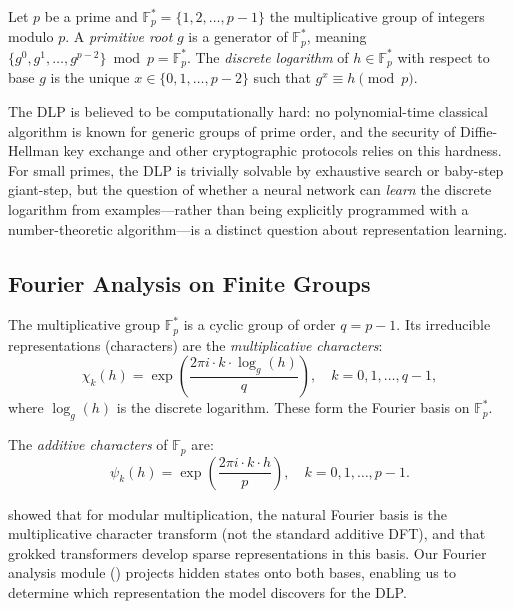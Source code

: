 \documentclass[11pt]{article}
\newcommand{\Fp}{\mathbb{F}_p}
\newcommand{\Fps}{\mathbb{F}_p^*}
\begin{document}
Let $p$ be a prime and $\Fps = \{1, 2, \ldots, p-1\}$ the multiplicative group of integers modulo $p$. A \emph{primitive root} $g$ is a generator of $\Fps$, meaning $\{g^0, g^1, \ldots, g^{p-2}\} \bmod p = \Fps$. The \emph{discrete logarithm} of $h \in \Fps$ with respect to base $g$ is the unique $x \in \{0, 1, \ldots, p-2\}$ such that $g^x \equiv h \pmod{p}$.

The DLP is believed to be computationally hard: no polynomial-time classical algorithm is known for generic groups of prime order, and the security of Diffie-Hellman key exchange \citep{diffie1976new} and other cryptographic protocols relies on this hardness. For small primes, the DLP is trivially solvable by exhaustive search or baby-step giant-step, but the question of whether a neural network can \emph{learn} the discrete logarithm from examples---rather than being explicitly programmed with a number-theoretic algorithm---is a distinct question about representation learning.

\subsection{Fourier Analysis on Finite Groups}

The multiplicative group $\Fps$ is a cyclic group of order $q = p - 1$. Its irreducible representations (characters) are the \emph{multiplicative characters}:
\begin{equation}
    \chi_k(h) = \exp\!\left(\frac{2\pi i \cdot k \cdot \log_g(h)}{q}\right), \quad k = 0, 1, \ldots, q-1,
\end{equation}
where $\log_g(h)$ is the discrete logarithm. These form the Fourier basis on $\Fps$.

The \emph{additive characters} of $\Fp$ are:
\begin{equation}
    \psi_k(h) = \exp\!\left(\frac{2\pi i \cdot k \cdot h}{p}\right), \quad k = 0, 1, \ldots, p-1.
\end{equation}

\citet{doshi2024discrete} showed that for modular multiplication, the natural Fourier basis is the multiplicative character transform (not the standard additive DFT), and that grokked transformers develop sparse representations in this basis. Our Fourier analysis module () projects hidden states onto both bases, enabling us to determine which representation the model discovers for the DLP.


\end{document}
